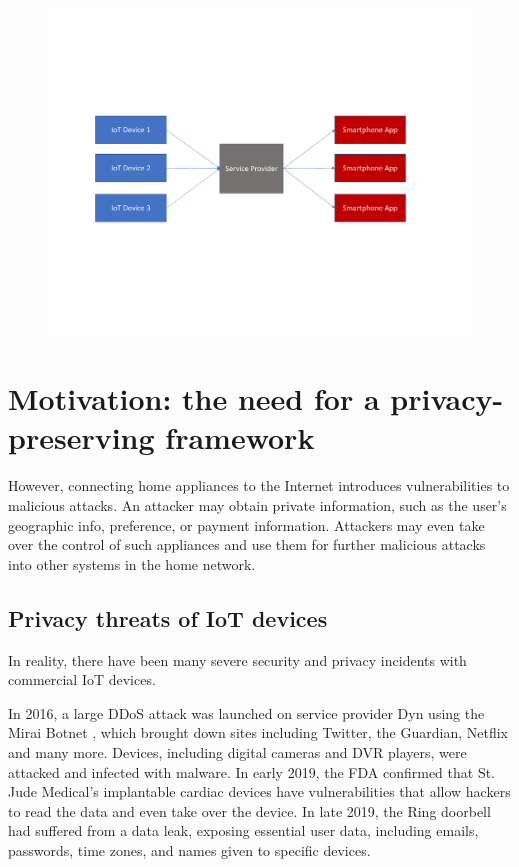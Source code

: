 \begin{figure}
	\includegraphics[width=\linewidth]{centralized_structure.pdf}
	\caption{}
	\label{fig:centralized}
\end{figure}

\section{Motivation: the need for a privacy-preserving framework}
However, connecting home appliances to the Internet introduces vulnerabilities to malicious attacks. An attacker may obtain private information, such as the user's geographic info, preference, or payment information. Attackers may even take over the control of such appliances and use them for further malicious attacks into other systems in the home network. 

\subsection{Privacy threats of IoT devices}
In reality, there have been many severe security and privacy incidents with commercial IoT devices.

In 2016, a large DDoS attack was launched on service provider Dyn using the Mirai Botnet \cite{antonakakis2017understanding}, which brought down sites including Twitter, the Guardian, Netflix and many more. Devices, including digital cameras and DVR players, were attacked and infected with malware. In early 2019, the FDA confirmed that St. Jude Medical's implantable cardiac devices have vulnerabilities that allow hackers to read the data and even take over the device. In late 2019, the Ring doorbell had suffered from a data leak, exposing essential user data, including emails, passwords, time zones, and names given to specific devices.

